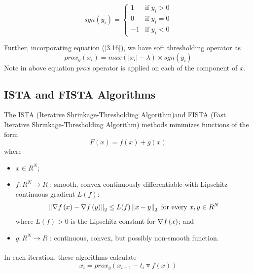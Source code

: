 \begin{equation}
sgn(y_i) =\left\lbrace
\begin{array}{ll}
  1 & \mbox{if }y_i>0 \\
  0 & \mbox{if }y_i=0 \\
 -1 & \mbox{if }y_i<0 
\end{array} \right.
\label{3.18}
\end{equation}


Further, incorporating equation (\ref{3.16}), we have soft thresholding operator as 
\begin{equation}
 prox_g(x_i) = max(|x_i|-\lambda) \times sgn(y_i)
\label{3.19}
\end{equation}
Note in above equation $prox$ operator is applied on each of the component of $x$.

\subsection{ISTA and FISTA Algorithms}
\label{s:algorithms_ista}

The ISTA (Iterative Shrinkage-Thresholding Algorithm)and FISTA (Fast Iterative Shrinkage-Thresholding Algorithm) 
\cite{fista} methods minimizes functions of the form
 \begin{equation}
  F({x}) = f({x}) + g({x})
 \end{equation}
 where
 \begin{itemize}
  \item
   $x \in R^N$;
  \item
   $f : R^N \rightarrow R$ : smooth, convex continuously differentiable with Lipschitz continuous gradient $L(f)$:
   $$
    \left\lVert \nabla f\left(x\right) - \nabla f\left(y\right) \right\rVert_2 \le L(f) \left\lVert x - y \right\rVert_2
    \mbox{ for every } {x}, {y} \in R^N
   $$
   where
   $L(f) > 0$ is the Lipschitz constant for $\nabla f\left(x\right)$; and

  \item
   $g : R^N \rightarrow R$ : continuous, convex, but possibly non-smooth function.
 \end{itemize}

\paragraph{}In each iteration, these algorithms calculate 
\begin{equation}
 x_i = prox_g(x_{i-1}-t_i\triangledown f(x))
\label{3.20}
\end{equation}

